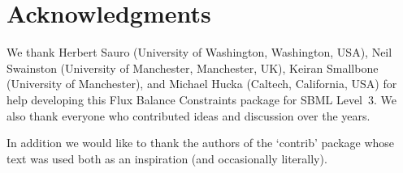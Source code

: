 
\section{Acknowledgments}

We thank Herbert Sauro (University of Washington, Washington, USA), Neil
Swainston (University of Manchester, Manchester, UK), Keiran Smallbone
(University of Manchester), and Michael Hucka (Caltech, California, USA)
for help developing this Flux Balance Constraints package for SBML
Level~3.  We also thank everyone who contributed ideas and discussion over
the years. 

In addition we would like to thank the authors of the `contrib' package whose text was used both as an inspiration (and occasionally literally).
